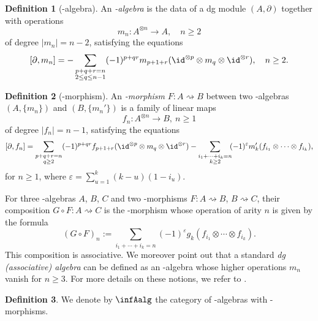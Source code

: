 \documentclass[JEP,XML,SOM,NoFloatCountersInSection,Unicode,published]{cedram}
\theoremstyle{definition}
\newtheorem{definition}{Definition}[section]
\theoremstyle{plain}
\begin{document}
\begin{definition}[\Ainf-algebra] \label{def:ainf-alg} An \emph{\Ainf-algebra} is the data of a dg module $(A,\partial)$ together with operations
\[
m_n : A^{\otimes n} \to A, \quad n \geq 2
\]
of degree $|m_n|=n-2$, satisfying the equations
\[
[\partial, m_n] = - \sum_{\substack{p+q+r=n \\ 2 \leq q \leq n-1}} (-1)^{p+qr}m_{p+1+r}(\id^{\otimes p} \otimes m_q \otimes \id^{\otimes r}), \quad n\geq 2.
\]
\end{definition}

\begin{definition}[\Ainf-morphism] \label{def:ainf-morph}
An \emph{\Ainf-morphism} $F : A\rightsquigarrow B$ between two \Ainf\nobreakdash-algebras $(A,\{m_n\})$ and $(B,\{m_n'\})$ is a family of linear maps
\[
f_n : A^{\otimes n} \to B, \ n \geq 1\]
of degree $|f_n|=n-1$, satisfying the equations
\[
[\partial, f_n] = \sum_{\substack{p+q+r=n \\ q \geq 2}} (-1)^{p+qr}f_{p+1+r}(\id^{\otimes p} \otimes m_q \otimes \id^{\otimes r}) - \sum_{\substack{i_1+\cdots+i_k=n \\ k \geq 2}}\hspace*{-1mm} (-1)^{\varepsilon} m_k'(f_{i_1}\otimes\cdots\otimes f_{i_k}),
\]
for $n \geqslant 1$, where $\varepsilon = \sum_{u=1}^{k}(k-u)(1-i_u)$.
\end{definition}

For three \Ainf-algebras $A$, $B$, $C$ and two \Ainf-morphisms $F : A \rightsquigarrow B$, $B \rightsquigarrow C$, their composition $G \circ F : A \rightsquigarrow C$ is the \Ainf-morphism whose operation of arity $n$ is given by the formula
\[
(G \circ F)_n := \sum_{i_1+\cdots+i_k=n} (-1)^{\varepsilon} g_k(f_{i_1}\otimes\cdots\otimes f_{i_k}).
\]
This composition is associative. We moreover point out that a standard \textit{dg (associative) algebra} can be defined as an \Ainf -algebra whose higher operations $m_n$ vanish for $n \geq 3$. For more details on these notions, we refer to \cite[Chap.\,9]{LodayVallette12}.

\begin{definition}
We denote by $\infAalg$ the category of \Ainf-algebras with \Ainf\nobreakdash-morphisms.
\end{definition}
\end{document}
